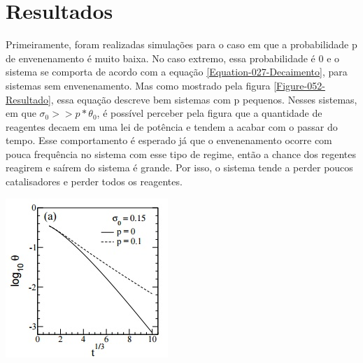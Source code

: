 
\section{Resultados}

Primeiramente, foram realizadas simulações para o caso em que a probabilidade p
de envenenamento é muito baixa. No caso extremo, essa probabilidade é 0 e o
sistema se comporta de acordo com a equação \ref{Equation-027-Decaimento}, para
sistemas sem envenenamento. Mas como mostrado pela figura
\ref{Figure-052-Resultado}, essa equação descreve bem sistemas com p pequenos.
Nesses sistemas, em que $\sigma_0 >> p*\theta_0$, é possível perceber pela
figura que a quantidade de reagentes decaem em uma lei de potência e tendem a
acabar com o passar do tempo. Esse comportamento é esperado já que o
envenenamento ocorre com pouca frequência no sistema com esse tipo de regime,
então a chance dos regentes reagirem e saírem do sistema é grande. Por isso, o
sistema tende a perder poucos catalisadores e perder todos os reagentes.

{
	\captionsetup{type=figure}
	\hfill \break
	\includegraphics[width=\columnwidth]{./figures/052-Resultado.jpg}
	\label{Figure-052-Resultado}
}

